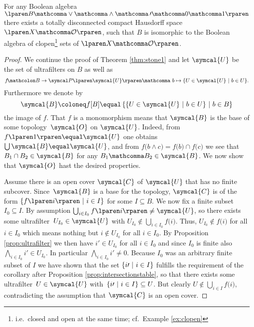 \begin{theorem}
\label{thm:stone2}
  For any Boolean algebra
  $\lparen B \mathcomma \vee \mathcomma \wedge \mathcomma \, \prime
  \mathcomma 0 \mathcomma 1 \rparen$
  there exists a totally disconnected compact Hausdorff space
  $\lparen X \mathcomma \mathcal{O} \rparen$,
  such that $B$ is isomorphic to the Boolean algebra of
  clopen\footnote{i.e.\ closed and open at the same time;
    cf.\ Example \ref{ex:clopen}}
  sets of $\lparen X \mathcomma \mathcal{O} \rparen$.
\end{theorem}

\begin{proof}
  We continue the proof of Theorem \ref{thm:stone1} and let
  $\symcal{U}$ be the set of ultrafilters on $B$
  as well as
  \[
    f
    \! \mathcolon
    B
    \rightarrow
    \Po{ \symcal{U} }
    \mathcomma \
    b
    \mapsto
    \lbrace
    U \in \symcal{U}
    \pipe
    b \in U
    \rbrace.
  \]
  Furthermore we denote by
  \[
    \symcal{B}
    \coloneq
    f \lbrack B \rbrack
    \equal
    \left \lbrace
    \lbrace
    U \in \symcal{U}
    \pipe
    b \in U
    \rbrace
    \pipe
    b \in B
    \right \rbrace
  \]
  the image of $f$.
  That $f$ is a monomorphism means
  that $\symcal{B}$ is the base
  of some topology~$\symcal{O}$ on $\symcal{U}$.
  Indeed, from $f \lparen 1 \rparen \equal \symcal{U}$
  one obtains $\bigcup \symcal{B} \equal \symcal{U}$,
  and from
  $f \lparen b \wedge c \rparen
    \equal f \lparen b \rparen \cap f \lparen c \rparen$
  we see that $B_1 \cap B_2 \in \symcal{B}$
  for any $B_1 \mathcomma B_2 \in \symcal{B}$.
  We now show that $\symcal{O}$ hast the desired properties.

  \smallskip

   \thinspace
  Assume there is an open cover $\symcal{C}$ of $\symcal{U}$
  that has no finite subcover.
  Since~$\symcal{B}$ is a base for the topology,
  $\symcal{C}$ is of the form
  $\lbrace f \lparen i \rparen \pipe  i \in I \rbrace$
  for some $I \subseteq B$.
  We now fix a finite subset $I_0 \subseteq I$.
  By assumption
  $\bigcup_{ i \in I_0 } f \lparen i \rparen \ne \symcal{U}$,
  so there exists some ultrafilter~$U_{ I_0 } \in \symcal{U}$
  with $U_{ I_0 } \notin \bigcup_{ i \in I_0 } f \lparen i \rparen$.
  Thus, $U_{ I_0 } \notin f \lparen i \rparen$ for all $i \in I_0$
  which means nothing but $i \notin U_{ I_0 }$ for all $i \in I_0$.
  By Proposition \ref{prop:ultrafilter} we then have
  $i \prime \in U_{ I_0 }$ for all $i \in I_0$
  and since $I_0$ is finite also
  $\bigwedge_{ i \in I_0 } i \prime \in U_{ I_0 }$.
  In particular $\bigwedge_{ i \in I_0 } i \prime \ne 0$.
  Because $I_0$ was an arbitrary finite subset of $I$
  we have shown that the set
  $\lbrace i \prime \ \vert\  i \in I \rbrace$
  fulfills the requirement of the corollary
  after Proposition \ref{prop:intersectionstable},
  so that there exists some ultrafilter~$U \in \symcal{U}$
  with~$\lbrace i \prime \ \vert\  i \in I \rbrace \subseteq U$.
  But clearly $U \notin \bigcup_{ i \in I } f \lparen i \rparen$,
  contradicting the assumption that $\symcal{C}$ is an open cover.


\end{proof}
